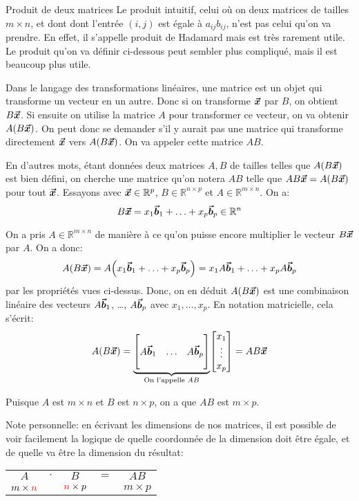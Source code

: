 \documentclass[a4paper]{article}
\begin{document}
\begin{parag}{Produit de deux matrices}
    Le produit intuitif, celui où on deux matrices de tailles $m \times n$, et dont dont l'entrée $\left(i, j\right)$ est égale à $a_{ij} b_{ij}$, n'est pas celui qu'on va prendre. En effet, il s'appelle produit de Hadamard mais est très rarement utile. Le produit qu'on va définir ci-dessous peut sembler plus compliqué, mais il est beaucoup plus utile.

    Dans le langage des transformations linéaires, une matrice est un objet qui transforme un vecteur en un autre. Donc si on transforme $\bm{\protect\vec{x}}$ par $B$, on obtient $B \bm{\protect\vec{x}}$. Si ensuite on utilise la matrice $A$ pour transformer ce vecteur, on va obtenir $A\left(B \bvec{x}\right)$. On peut donc se demander s'il y aurait pas une matrice qui transforme directement $\bm{\protect\vec{x}}$ vers $A\left(B \bvec{x}\right)$. On va appeler cette matrice $AB$.

    En d'autres mots, étant données deux matrices $A, B$ de tailles telles que $A\left(B \bvec{x}\right)$ est bien défini, on cherche une matrice qu'on notera $AB$ telle que $AB \bvec{x} = A\left(B \bvec{x}\right)$ pour tout $\bm{\protect\vec{x}}$. Essayons avec $\bm{\protect\vec{x}} \in \mathbb{R}^{p}$, $B \in \mathbb{R}^{n \times p}$ et $A \in \mathbb{R}^{m \times n}$. On a:
    \[B \bm{\protect\vec{x}} = x_1 \bm{\protect\vec{b}}_1 + \ldots + x_p \bm{\protect\vec{b}}_p \in \mathbb{R}^{n}\]

    On a pris $A \in \mathbb{R}^{m \times n}$ de manière à ce qu'on puisse encore multiplier le vecteur $B \bm{\protect\vec{x}}$ par $A$. On a donc:
    \[A\left(B \bvec{x}\right) = A\left(x_1 \bvec{b}_1 + \ldots + x_p \bvec{b}_p\right) = x_1 A \bvec{b}_1 + \ldots + x_p A \bvec{b}_p\]
    par les propriétés vues ci-dessus. Donc, on en déduit $A\left(B \bvec{x}\right)$ est une combinaison linéaire des vecteurs $A \bm{\protect\vec{b}}_1$, \ldots, $A \bm{\protect\vec{b}}_p$ avec $x_1, \ldots, x_p$. En notation matricielle, cela s'écrit:
    \[A\left(B \bvec{x}\right) = \underbrace{\begin{bmatrix}  &  &  \\ A \bvec{b}_1 & \ldots & A \bvec{b}_p \\  &  &  \end{bmatrix}}_{\text{On l'appelle } AB} \begin{bmatrix} x_1 \\ \vdots \\ x_p \end{bmatrix} = AB \bvec{x}\]

    Puisque $A$ est $m \times n$ et $B$ est $n \times p$, on a que $AB$ est $m \times p$.

    Note personnelle: en écrivant les dimensions de nos matrices, il est possible de voir facilement la logique de quelle coordonnée de la dimension doit être égale, et de quelle va être la dimension du résultat:
    \begin{center}
    \begin{tabular}{ccccc}
        $A$ & $\cdot$ & $B$ & $=$ & $AB$ \\
        $m \times \color{red}{n}$ & & ${\color{red}n} \times p$ & & $m \times p$
    \end{tabular}
    \end{center}
\end{parag}
\end{document}
